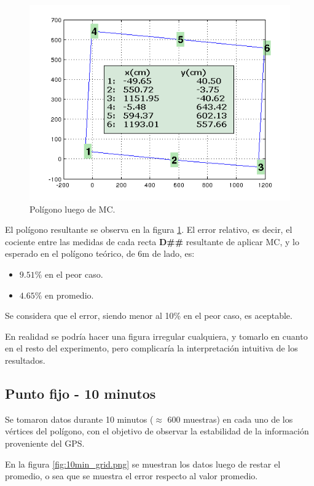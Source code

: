 \documentclass[spanish,12pt,a4paper,titlepage]{report}
\begin{document}
\begin{figure}
  \begin{center}
    \includegraphics[width=.5\textwidth]{./img/pol_mc.png}
  \end{center}
  \caption{Polígono luego de MC.}
\label{fig:pol_mc.png}
\end{figure}

El polígono resultante se observa en la figura \ref{fig:pol_mc.png}. El error relativo, es decir, el cociente entre las medidas de cada recta \textbf{D\#\#} resultante de aplicar MC, y lo esperado en el polígono teórico, de 6m de lado, es:

\begin{itemize}
\item $9.51\%$ en el peor caso.
\item $4.65\%$ en promedio.
\end{itemize}

Se considera que el error, siendo  menor al 10\% en el peor caso, es aceptable.

En realidad se podría hacer una figura irregular cualquiera, y tomarlo en cuanto en el resto del experimento, pero complicaría la interpretación intuitiva de los resultados.

\newpage
\subsection{Punto fijo - 10 minutos}
\label{sec:gps2-punto-fijo-10-minutos}

Se tomaron datos durante 10 minutos ($\approx$ 600 muestras) en cada uno de los vértices del polígono, con el objetivo de observar la estabilidad de la información proveniente del GPS.

En la figura \ref{fig:10min_grid.png} se muestran los datos luego de restar el promedio, o sea que se muestra el error respecto al valor promedio.
\end{document}
